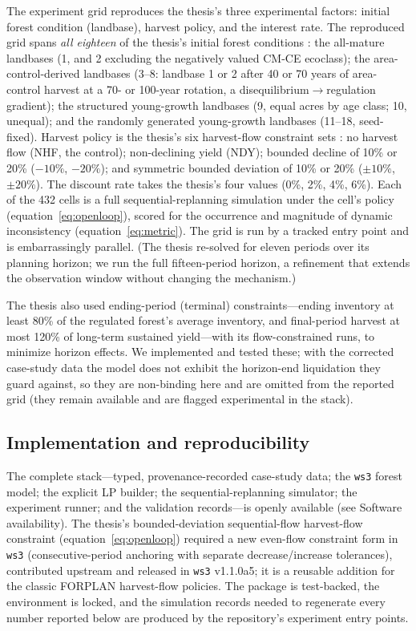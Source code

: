 The experiment grid reproduces the thesis's three experimental factors: initial forest condition (landbase), harvest policy, and the interest rate. The reproduced grid spans \emph{all eighteen} of the thesis's initial forest conditions \citep[Table~5.5]{daugherty1991credibility}: the all-mature landbases (1, and 2 excluding the negatively valued CM-CE ecoclass); the area-control-derived landbases (3--8: landbase 1 or 2 after 40 or 70 years of area-control harvest at a 70- or 100-year rotation, a disequilibrium\(\to\)regulation gradient); the structured young-growth landbases (9, equal acres by age class; 10, unequal); and the randomly generated young-growth landbases (11--18, seed-fixed). Harvest policy is the thesis's six harvest-flow constraint sets \citep[Table~5.6]{daugherty1991credibility}: no harvest flow (NHF, the control); non-declining yield (NDY); bounded decline of 10\% or 20\% (\(-10\%\), \(-20\%\)); and symmetric bounded deviation of 10\% or 20\% (\(\pm10\%\), \(\pm20\%\)). The discount rate takes the thesis's four values (0\%, 2\%, 4\%, 6\%). Each of the 432 cells is a full sequential-replanning simulation under the cell's policy (equation~\eqref{eq:openloop}), scored for the occurrence and magnitude of dynamic inconsistency (equation~\eqref{eq:metric}). The grid is run by a tracked entry point and is embarrassingly parallel. (The thesis re-solved for eleven periods over its planning horizon; we run the full fifteen-period horizon, a refinement that extends the observation window without changing the mechanism.)

The thesis also used ending-period (terminal) constraints---ending inventory at least 80\% of the regulated forest's average inventory, and final-period harvest at most 120\% of long-term sustained yield---with its flow-constrained runs, to minimize horizon effects. We implemented and tested these; with the corrected case-study data the model does not exhibit the horizon-end liquidation they guard against, so they are non-binding here and are omitted from the reported grid (they remain available and are flagged experimental in the stack).

\hypertarget{implementation-and-reproducibility}{%
\subsection{Implementation and reproducibility}\label{implementation-and-reproducibility}}

The complete stack---typed, provenance-recorded case-study data; the \texttt{ws3} forest model; the explicit LP builder; the sequential-replanning simulator; the experiment runner; and the validation records---is openly available (see Software availability). The thesis's bounded-deviation sequential-flow harvest-flow constraint (equation~\eqref{eq:openloop}) required a new even-flow constraint form in \texttt{ws3} (consecutive-period anchoring with separate decrease/increase tolerances), contributed upstream and released in \texttt{ws3} v1.1.0a5; it is a reusable addition for the classic FORPLAN harvest-flow policies. The package is test-backed, the environment is locked, and the simulation records needed to regenerate every number reported below are produced by the repository's experiment entry points.
